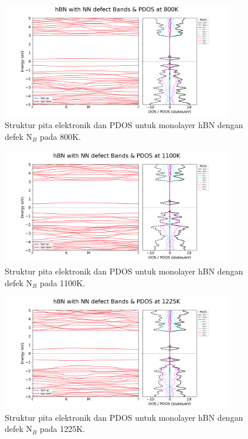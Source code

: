 \begin{figure}[h!]
    \centering
    \includegraphics[width=0.9\textwidth]{gambar_hasil/simple_bands_pdos_NN_800K.png}
    \caption{Struktur pita elektronik dan PDOS untuk monolayer hBN dengan defek N$_B$ pada 800K.}
    \label{fig:hbn_NN_800K}
\end{figure}
\begin{figure}[h!]
    \centering
    \includegraphics[width=0.9\textwidth]{gambar_hasil/simple_bands_pdos_NN_1100K.png}
    \caption{Struktur pita elektronik dan PDOS untuk monolayer hBN dengan defek N$_B$ pada 1100K.}
    \label{fig:hbn_NN_1100K}
\end{figure}
\begin{figure}[h!]
    \centering
    \includegraphics[width=0.9\textwidth]{gambar_hasil/simple_bands_pdos_NN_1225K.png}
    \caption{Struktur pita elektronik dan PDOS untuk monolayer hBN dengan defek N$_B$ pada 1225K.}
    \label{fig:hbn_NN_1225K}
\end{figure}
